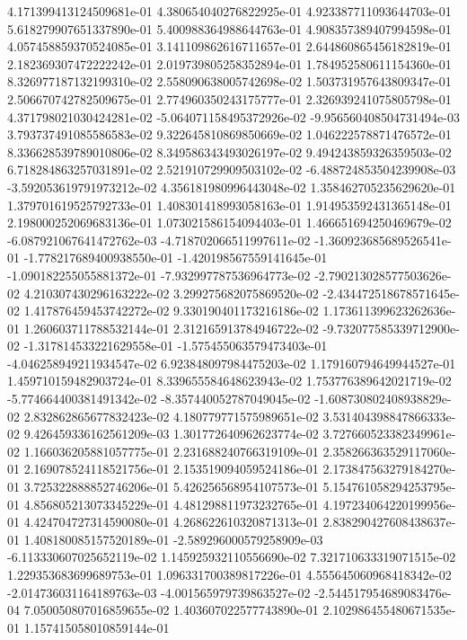 4.171399413124509681e-01
4.380654040276822925e-01
4.923387711093644703e-01
5.618279907651337890e-01
5.400988364988644763e-01
4.908357389407994598e-01
4.057458859370524085e-01
3.141109862616711657e-01
2.644860865456182819e-01
2.182369307472222242e-01
2.019739805258352894e-01
1.784952580611154360e-01
8.326977187132199310e-02
2.558090638005742698e-02
1.503731957643809347e-01
2.506670742782509675e-01
2.774960350243175777e-01
2.326939241075805798e-01
4.371798021030424281e-02
-5.064071158495372926e-02
-9.956560408504731494e-03
3.793737491085586583e-02
9.322645810869850669e-02
1.046222578871476572e-01
8.336628539789010806e-02
8.349586343493026197e-02
9.494243859326359503e-02
6.718284863257031891e-02
2.521910729909503102e-02
-6.488724853504239908e-03
-3.592053619791973212e-02
4.356181980996443048e-02
1.358462705235629620e-01
1.379701619525792733e-01
1.408301418993058163e-01
1.914953592431365148e-01
2.198000252069683136e-01
1.073021586154094403e-01
1.466651694250469679e-02
-6.087921067641472762e-03
-4.718702066511997611e-02
-1.360923685689526541e-01
-1.778217689400938550e-01
-1.420198567559141645e-01
-1.090182255055881372e-01
-7.932997787536964773e-02
-2.790213028577503626e-02
4.210307430296163222e-02
3.299275682075869520e-02
-2.434472518678571645e-02
1.417876459453742272e-02
9.330190401173216186e-02
1.173611399623262636e-01
1.260603711788532144e-01
2.312165913784946722e-02
-9.732077585339712900e-02
-1.317814533221629558e-01
-1.575455063579473403e-01
-4.046258949211934547e-02
6.923848097984475203e-02
1.179160794649944527e-01
1.459710159482903724e-01
8.339655584648623943e-02
1.753776389642021719e-02
-5.774664400381491342e-02
-8.357440052787049045e-02
-1.608730802408938829e-02
2.832862865677832423e-02
4.180779771575989651e-02
3.531404398847866333e-02
9.426459336162561209e-03
1.301772640962623774e-02
3.727660523382349961e-02
1.166036205881057775e-01
2.231688240766319109e-01
2.358266363529117060e-01
2.169078524118521756e-01
2.153519094059524186e-01
2.173847563279184270e-01
3.725322888852746206e-01
5.426256568954107573e-01
5.154761058294253795e-01
4.856805213073345229e-01
4.481298811973232765e-01
4.197234064220199956e-01
4.424704727314590080e-01
4.268622610320871313e-01
2.838290427608438637e-01
1.408180085157520189e-01
-2.589296000579258909e-03
-6.113330607025652119e-02
1.145925932110556690e-02
7.321710633319071515e-02
1.229353683699689753e-01
1.096331700389817226e-01
4.555645060968418342e-02
-2.014736031164189763e-03
-4.001565979739863527e-02
-2.544517954689083476e-04
7.050050807016859655e-02
1.403607022577743890e-01
2.102986455480671535e-01
1.157415058010859144e-01
